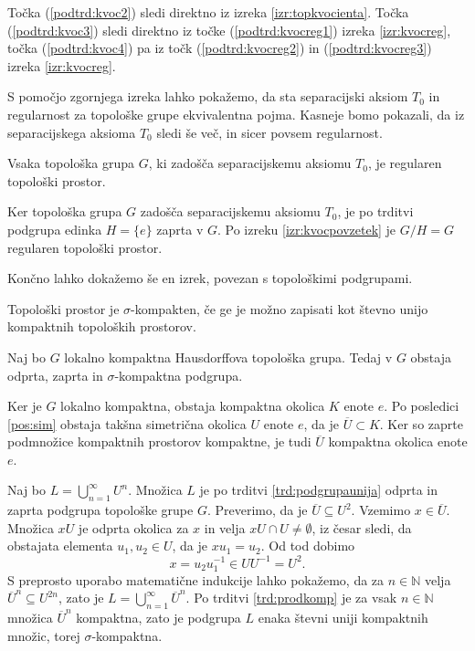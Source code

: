 \documentclass[mat1]{fmfdelo}
\newcommand{\N}{\mathbb N}
\newcommand{\closure}[1]{\overline{#1}}
\begin{document}
\begin{dokaz}
Točka (\ref{podtrd:kvoc2}) sledi direktno iz izreka \ref{izr:topkvocienta}.
Točka (\ref{podtrd:kvoc3}) sledi direktno iz točke (\ref{podtrd:kvocreg1}) izreka \ref{izr:kvocreg}, točka (\ref{podtrd:kvoc4}) pa iz točk (\ref{podtrd:kvocreg2}) in (\ref{podtrd:kvocreg3}) izreka \ref{izr:kvocreg}.
\end{dokaz}

S pomočjo zgornjega izreka lahko pokažemo, da sta separacijski aksiom $T_0$ in regularnost za topološke grupe ekvivalentna pojma. Kasneje bomo pokazali, da iz separacijskega aksioma $T_0$ sledi še več, in sicer povsem regularnost.

\begin{posledica}\label{izr:t3}
	Vsaka topološka grupa $G$, ki zadošča separacijskemu aksiomu $T_0$, je regularen topološki prostor.
\end{posledica}

\begin{dokaz}
Ker topološka grupa $G$ zadošča separacijskemu aksiomu $T_0$, je po trditvi podgrupa edinka $H = \lbrace e \rbrace$ zaprta v $G$. Po izreku \ref{izr:kvocpovzetek} je $G/H = G$ regularen topološki prostor.
\end{dokaz}

Končno lahko dokažemo še en izrek, povezan s topološkimi podgrupami.

\begin{definicija}
	Topološki prostor je $\sigma$-kompakten, če ge je možno zapisati kot števno unijo kompaktnih topoloških prostorov.
\end{definicija}

\begin{izrek}\label{izr:odpzapsigma}
	Naj bo $G$ lokalno kompaktna Hausdorffova topološka grupa. Tedaj v $G$ obstaja odprta, zaprta in $\sigma$-kompaktna podgrupa.
\end{izrek}

\begin{dokaz}
	Ker je $G$ lokalno kompaktna, obstaja kompaktna okolica $K$ enote $e$. Po posledici \ref{pos:sim} obstaja takšna simetrična okolica $U$ enote $e$, da je $\closure{U} \subset K$. Ker so zaprte podmnožice kompaktnih prostorov kompaktne, je tudi $\closure{U}$ kompaktna okolica enote $e$.
	
	Naj bo $L = \bigcup_{n=1}^\infty U^n$. Množica $L$ je po trditvi \ref{trd:podgrupaunija} odprta in zaprta podgrupa topološke grupe $G$.
	Preverimo, da je $\closure{U} \subseteq U^2$. Vzemimo $x \in \closure{U}$. Množica $xU$ je odprta okolica za $x$ in velja $xU \cap U \neq \emptyset$, iz česar sledi, da obstajata elementa $u_1,u_2 \in U$, da je $xu_1 = u_2$. Od tod dobimo
	\[ x = u_2u_1^{-1} \in UU^{-1} = U^2. \]
	S preprosto uporabo matematične indukcije lahko pokažemo, da za $n \in \N$ velja $\closure{U}^n \subseteq U^{2n}$, zato je $L = \bigcup_{n=1}^\infty \closure{U}^n$. Po trditvi \ref{trd:prodkomp} je za vsak $n \in \N$ množica $\closure{U}^n$ kompaktna, zato je podgrupa $L$ enaka števni uniji kompaktnih množic, torej $\sigma$-kompaktna.
\end{dokaz}
\end{document}
